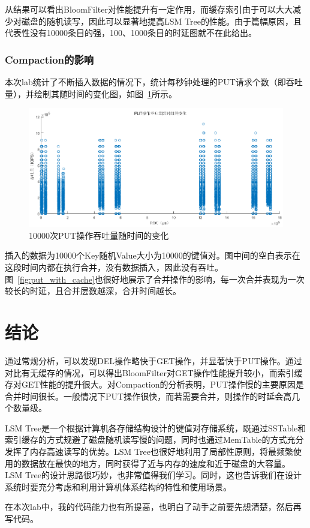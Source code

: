 \documentclass[fontset=windows]{article}
\begin{document}
\begin{enumerate}
从结果可以看出BloomFilter对性能提升有一定作用，而缓存索引由于可以大大减少对磁盘的随机读写，因此可以显著地提高LSM Tree的性能。由于篇幅原因，且代表性没有10000条目的强，100、1000条目的时延图就不在此给出。
    
\end{enumerate}

\subsubsection{Compaction的影响}
本次lab统计了不断插入数据的情况下，统计每秒钟处理的PUT请求个数（即吞吐量），并绘制其随时间的变化图，如图~\ref{fig:put_iops}所示。

\begin{figure}[h!]
\centering
\includegraphics[scale=0.5]{put_iops}
\caption{10000次PUT操作吞吐量随时间的变化}
\label{fig:put_iops}
\end{figure}

插入的数据为10000个Key随机Value大小为10000的键值对。图中间的空白表示在这段时间内都在执行合并，没有数据插入，因此没有吞吐。图~\ref{fig:put_with_cache}也很好地展示了合并操作的影响，每一次合并表现为一次较长的时延，且合并层数越深，合并时间越长。

\section{结论}

通过常规分析，可以发现DEL操作略快于GET操作，并显著快于PUT操作。通过对比有无缓存的情况，可以得出BloomFilter对GET操作性能提升较小，而索引缓存对GET性能的提升很大。对Compaction的分析表明，PUT操作慢的主要原因是合并时间很长。一般情况下PUT操作很快，而若需要合并，则操作的时延会高几个数量级。

LSM Tree是一个根据计算机各存储结构设计的键值对存储系统，既通过SSTable和索引缓存的方式规避了磁盘随机读写慢的问题，同时也通过MemTable的方式充分发挥了内存高速读写的优势。LSM Tree也很好地利用了局部性原则，将最频繁使用的数据放在最快的地方，同时获得了近与内存的速度和近于磁盘的大容量。LSM Tree的设计思路很巧妙，也非常值得我们学习。同时，这也告诉我们在设计系统时要充分考虑和利用计算机体系结构的特性和使用场景。

在本次lab中，我的代码能力也有所提高，也明白了动手之前要先想清楚，然后再写代码。
\end{document}
